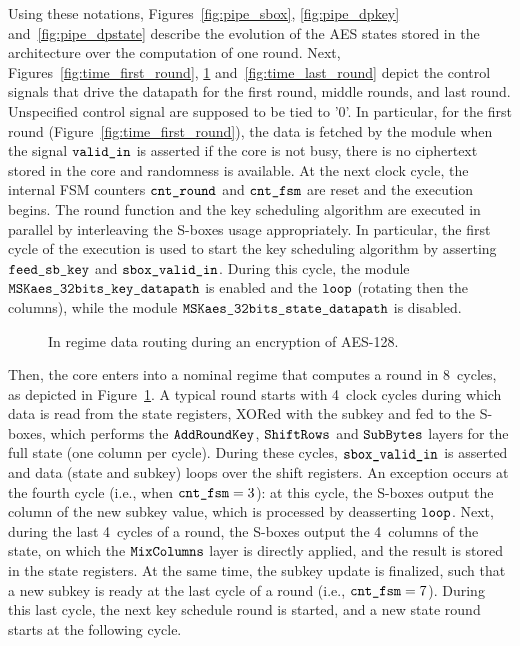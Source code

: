 \documentclass{scrartcl}
\begin{document}
Using these notations, Figures~\ref{fig:pipe_sbox}, \ref{fig:pipe_dpkey}
and~\ref{fig:pipe_dpstate} describe the evolution of the AES states stored in
the architecture over the computation of one round.
Next, Figures~\ref{fig:time_first_round}, \ref{fig:time_regime}
and~\ref{fig:time_last_round} depict the control signals that drive the
datapath for the first round, middle rounds, and last round. Unspecified control signal are supposed to be tied to '0'.
In particular, for the first round (Figure~\ref{fig:time_first_round}), the
data is fetched by the module when the signal $\texttt{valid\_in}$ is asserted if
the core is not busy, there is no ciphertext stored in the core and randomness
is available.
At the next clock cycle, the
internal FSM counters $\texttt{cnt\_round}$ and $\texttt{cnt\_fsm}$ are reset and the
execution begins. The round function and the key scheduling algorithm are
executed in parallel by interleaving the S-boxes usage appropriately. In
particular, the first cycle of the execution is used to start the key
scheduling algorithm by asserting $\texttt{feed\_sb\_key}$ and $\texttt{sbox\_valid\_in}$.
During this cycle, the module $\texttt{MSKaes\_32bits\_key\_datapath}$ is enabled and the
$\texttt{loop}$ (rotating then the columns), while the module $\texttt{MSKaes\_32bits\_state\_datapath}$
is disabled.
\begin{figure}
    \centering
     
    \caption{In regime data routing during an encryption of AES-128.}
    \label{fig:time_regime}
\end{figure}

Then, the core enters into a nominal regime that computes a round in 8~cycles,
as depicted in Figure~\ref{fig:time_regime}.  A typical round starts with
4~clock cycles during which data is read from the state registers, XORed with
the subkey and fed to the S-boxes, which performs the $\texttt{AddRoundKey}$, $\texttt{ShiftRows}$ and $\texttt{SubBytes}$
layers for the full state (one column per cycle).  During these cycles,
$\texttt{sbox\_valid\_in}$ is asserted and data (state and subkey) loops over the shift
registers. An exception occurs at the fourth cycle (i.e., when
$\texttt{cnt\_fsm}=3$): at this cycle, the S-boxes output the column of the new
subkey value, which is processed by deasserting $\texttt{loop}$.  Next, during
the last 4~cycles of a round, the S-boxes output the 4~columns of the state, on
which the $\texttt{MixColumns}$ layer is directly applied, and the result is stored in the
state registers. At the same time, the subkey update is finalized, such that a
new subkey is ready at the last cycle of a round (i.e., $\texttt{cnt\_fsm}=7$).
During this last cycle, the next key schedule round is started, and a new state
round starts at the following cycle.
\end{document}

